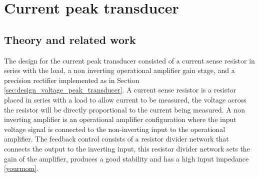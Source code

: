 \chapter{Current peak transducer}
\section{Theory and related work} \label{sec:literature_current_peak_transducer}
The design for the current peak transducer consisted of a current sense resistor in series with the load, a non inverting operational amplifier gain stage, and a precision rectifier implemented as in Section \ref{sec:design_voltage_peak_transducer}. A current sense resistor is a resistor placed in series with a load to allow current to be measured, the voltage across the resistor will be directly proportional to the current being measured. A non inverting amplifier is an operational amplifier configuration where the input voltage signal is connected to the non-inverting input to the operational amplifier. The feedback control consists of a resistor divider network that connects the output to the inverting input, this resistor divider network sets the gain of the amplifier, produces a good stability and has a high input impedance \ref{yourmom}. 

